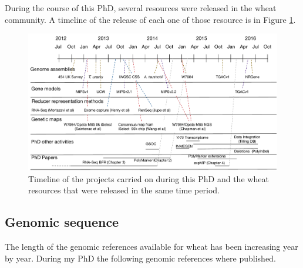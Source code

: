 During the course of this PhD, several resources were released in the wheat community. A timeline of the release of each one of those resource is in Figure \ref{fig:intro:timeline}. 

 \begin{figure}
  \centering
  \includegraphics[width=1\textheight]{Introduction/RicardoPhdTimelineV1.pdf}
  \caption[PhD timeline.]{Timeline of the projects carried on during this PhD and the wheat resources that were released in the same time period. }
  \label{fig:intro:timeline}
 \end{figure}
\subsection{Genomic sequence}

The length of the genomic references available for wheat has been increasing year by year. During my PhD the following genomic references where published.   

